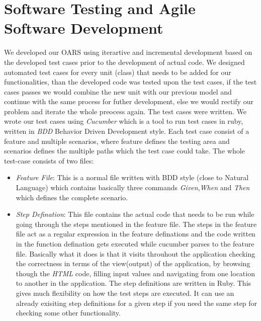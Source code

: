 \documentclass[letterpaper,12pt]{article}
\begin{document}
\section{Software Testing and Agile Software Development}
We developed our OARS using iterartive and incremental development based on the developed test cases prior to the development of actual code. We designed automated test cases for every unit (class) that needs to be added for our functionalities, than the developed code was tested upon the test cases, if the test cases passes we would combine the new unit with our previous model and continue with the same process for futher development, else we would rectify our problem and iterate the whole preocess again. The test cases were written. We wrote our test cases using \emph{Cucumber} which is a tool to run test cases in ruby, written in \emph{BDD}  Behavior Driven Development style. Each test case consist of a feature and multiple scenarios, where feature defines the testing area and scenarios defines the multiple paths which the test case could take. The whole test-case consists of two files:
\begin{itemize}
\item \emph{Feature File}: This is a normal file written with BDD style (close to Natural Language) which contains basically three commands \emph{Given},\emph{When} and \emph{Then} which defines the complete scenario.
\item \emph{Step Defination}: This file contains the actual code that needs to be run while going through the steps mentioned in the feature file. The steps in the feature file act as a regular expression in the feature definations and the code written in the function defination gets executed while cucumber parses to the feature file. Basically what it does is that it visits throuhout the application checking the correctness in terms of the view(output) of the application, by browsing though the \emph{HTML} code, filling input values and navigating from one location to another in the application. The step definitions are written in Ruby. This gives much flexibility on how the test steps are executed. It can use an already exisiting step definitions for a given step if you need the same step for checking some other functionality.
\end{itemize} 
\end{document}
